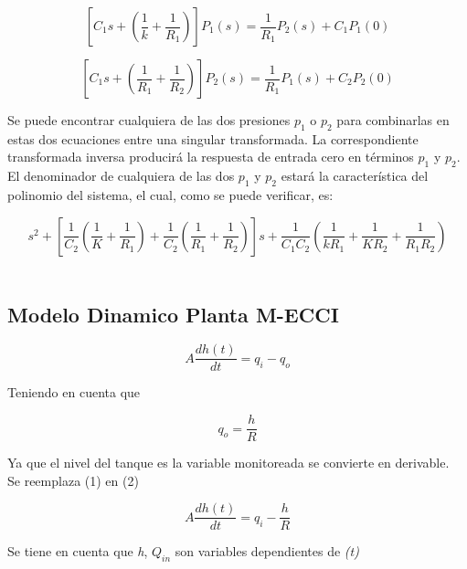 \documentclass[a4paper,12pt,twoside]{proyectotanquesecci}
\begin{document}
\begin{equation}
\left[ C_{1}s+\left( \frac {1}{k}+\frac {1}{R_{1}}\right) \right] P_{1}\left( s\right) =\frac {1}{R_{1}}P_{2}\left( s\right) +C_{1}P_{1}\left( 0\right) 
\end{equation}

\begin{equation}
\left[ C_{1}s+\left( \frac {1}{R_{1}}+\frac {1}{R_{2}}\right) \right] P_{2}\left( s\right) =\frac {1}{R_{1}}P_{1}\left( s\right) +C_{2}P_{2}\left( 0\right) 
\end{equation}

Se puede encontrar cualquiera de las dos presiones $p_{1}$ o $p_{2}$ para combinarlas en estas dos ecuaciones entre una singular transformada. La correspondiente transformada inversa producirá la respuesta de entrada cero en términos $p_{1}$ y $p_{2}$. El denominador de cualquiera de las dos $p_{1}$ y $p_{2}$ estará la característica del polinomio del sistema, el cual, como se puede verificar, es:

\begin{equation}
s^{2}+\left[ \frac {1}{C_{2}}\left( \frac {1}{K}+\frac {1}{R_{1}}\right) +\frac {1}{C_{2}}\left( \frac {1}{R_{1}}+\frac {1}{R_{2}}\right) \right] s+\frac {1}{C_{1}C_{2}}\left( \frac {1}{kR_{1}}+\frac {1}{KR_{2}}+\frac {1}{R_{1}R_{2}}\right) 
\end{equation} \\


\subsection{Modelo Dinamico Planta M-ECCI}

\begin{equation}
A\frac {dh\left( t\right) }{dt}=q_{i}-q_{o}
\end{equation}

Teniendo en cuenta 	que

\begin{equation}
q_{o}=\frac{h}{R}
\end{equation}

Ya que el nivel del tanque es la variable monitoreada se convierte en derivable.\\
Se reemplaza (1) en (2)

\begin{equation}
A\frac {dh\left( t\right) }{dt}=q_{i}-\frac {h}{R}
\end{equation}

Se tiene en cuenta que \textit{h}, $Q_{in}$ son variables dependientes de \textit{(t)}
\end{document}
